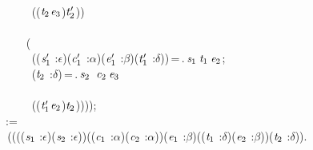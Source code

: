 \,\,\,\,\,\,\,\,\,\,\,\,\,\,\,\\
\,\,\,\,\,\,\,\,\,\,\,\,\,\,\,\,\,((\ensuremath{\HOLBoundVar{t}\sb{\mathrm{2}}}\HOLSymConst{,}\ensuremath{\HOLBoundVar{e}\sb{\mathrm{3}}})\HOLSymConst{,}\ensuremath{\HOLBoundVar{t}\sb{\mathrm{2}}\sp{\prime{}}}))\\
\,\,\,\,\,\,\,\,\,\,\,\,\\
\,\,\,\,\,\,\,\,\,\,\,\,\,\,(\\
\,\,\,\,\,\,\,\,\,\,\,\,\,\,\,\,\,((\ensuremath{\HOLBoundVar{s}\sb{\mathrm{1}}\sp{\prime{}}} :\ensuremath{\epsilon})\HOLSymConst{,}(\ensuremath{\HOLBoundVar{c}\sb{\mathrm{1}}\sp{\prime{}}} :\ensuremath{\alpha})\HOLSymConst{,}(\ensuremath{\HOLBoundVar{e}\sb{\mathrm{1}}\sp{\prime{}}} :\ensuremath{\beta})\HOLSymConst{,}(\ensuremath{\HOLBoundVar{t}\sb{\mathrm{1}}\sp{\prime{}}} :\ensuremath{\delta}))\,=\,.\,\ensuremath{\HOLBoundVar{s}\sb{\mathrm{1}}}\,\ensuremath{\HOLBoundVar{t}\sb{\mathrm{1}}}\,\ensuremath{\HOLBoundVar{e}\sb{\mathrm{2}}};\\
\,\,\,\,\,\,\,\,\,\,\,\,\,\,\,\,\,(\ensuremath{\HOLBoundVar{t}\sb{\mathrm{2}}} :\ensuremath{\delta})\,=\,.\,\ensuremath{\HOLBoundVar{s}\sb{\mathrm{2}}}\,\,\,\ensuremath{\HOLBoundVar{c}\sb{\mathrm{2}}}\,\ensuremath{\HOLBoundVar{e}\sb{\mathrm{3}}}\\
\,\,\,\,\,\,\,\,\,\,\,\,\,\,\,\\
\,\,\,\,\,\,\,\,\,\,\,\,\,\,\,\,\,((\ensuremath{\HOLBoundVar{t}\sb{\mathrm{1}}\sp{\prime{}}}\HOLSymConst{,}\ensuremath{\HOLBoundVar{e}\sb{\mathrm{2}}})\HOLSymConst{,}\ensuremath{\HOLBoundVar{t}\sb{\mathrm{2}}}))));\\
\,\,\,:=\\
\,\,\,\,(\HOLTokenLambda{}(((\ensuremath{\HOLBoundVar{s}\sb{\mathrm{1}}} :\ensuremath{\epsilon})\HOLSymConst{,}(\ensuremath{\HOLBoundVar{s}\sb{\mathrm{2}}} :\ensuremath{\epsilon}))\HOLSymConst{,}((\ensuremath{\HOLBoundVar{c}\sb{\mathrm{1}}} :\ensuremath{\alpha})\HOLSymConst{,}(\ensuremath{\HOLBoundVar{c}\sb{\mathrm{2}}} :\ensuremath{\alpha}))\HOLSymConst{,}(\ensuremath{\HOLBoundVar{e}\sb{\mathrm{1}}} :\ensuremath{\beta})\HOLSymConst{,}((\ensuremath{\HOLBoundVar{t}\sb{\mathrm{1}}} :\ensuremath{\delta})\HOLSymConst{,}(\ensuremath{\HOLBoundVar{e}\sb{\mathrm{2}}} :\ensuremath{\beta}))\HOLSymConst{,}(\ensuremath{\HOLBoundVar{t}\sb{\mathrm{2}}} :\ensuremath{\delta})).\\
